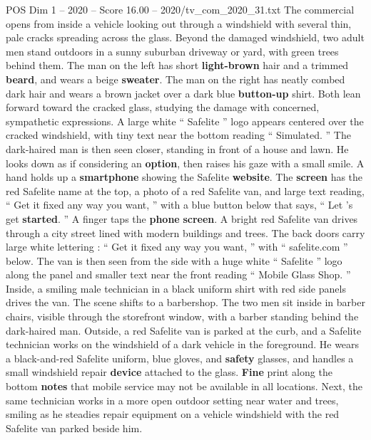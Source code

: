 \begin{textsample}{POS Dim 1 – 2020 – Score 16.00 – 2020/tv\_com\_2020\_31.txt}  \label{ex:f1_pos_011}
The commercial opens from inside a vehicle looking out through a windshield with several thin, pale cracks spreading across the glass.
Beyond the damaged windshield, two adult men stand outdoors in a sunny suburban driveway or yard, with green trees behind them.
The man on the left has short \textbf{light-brown} hair and a trimmed \textbf{beard}, and wears a beige \textbf{sweater}.
The man on the right has neatly combed dark hair and wears a brown jacket over a dark blue \textbf{button-up} shirt.
Both lean forward toward the cracked glass, studying the damage with concerned, sympathetic expressions.
A large white “ Safelite ” logo appears centered over the cracked windshield, with tiny text near the bottom reading “ Simulated. ” The dark-haired man is then seen closer, standing in front of a house and lawn.
He looks down as if considering an \textbf{option}, then raises his gaze with a small smile.
A hand holds up a \textbf{smartphone} showing the Safelite \textbf{website}.
The \textbf{screen} has the red Safelite name at the top, a photo of a red Safelite van, and large text reading, “ Get it fixed any way you want, ” with a blue button below that says, “ Let ’s get \textbf{started}. ” A finger taps the \textbf{phone} \textbf{screen}.
A bright red Safelite van drives through a city street lined with modern buildings and trees.
The back doors carry large white lettering : “ Get it fixed any way you want, ” with “ safelite.com ” below.
The van is then seen from the side with a huge white “ Safelite ” logo along the panel and smaller text near the front reading “ Mobile Glass Shop. ” Inside, a smiling male technician in a black uniform shirt with red side panels drives the van.
The scene shifts to a barbershop.
The two men sit inside in barber chairs, visible through the storefront window, with a barber standing behind the dark-haired man.
Outside, a red Safelite van is parked at the curb, and a Safelite technician works on the windshield of a dark vehicle in the foreground.
He wears a black-and-red Safelite uniform, blue gloves, and \textbf{safety} glasses, and handles a small windshield repair \textbf{device} attached to the glass. \textbf{Fine} print along the bottom \textbf{notes} that mobile service may not be available in all locations.
Next, the same technician works in a more open outdoor setting near water and trees, smiling as he steadies repair equipment on a vehicle windshield with the red Safelite van parked beside him.

\end{textsample}
